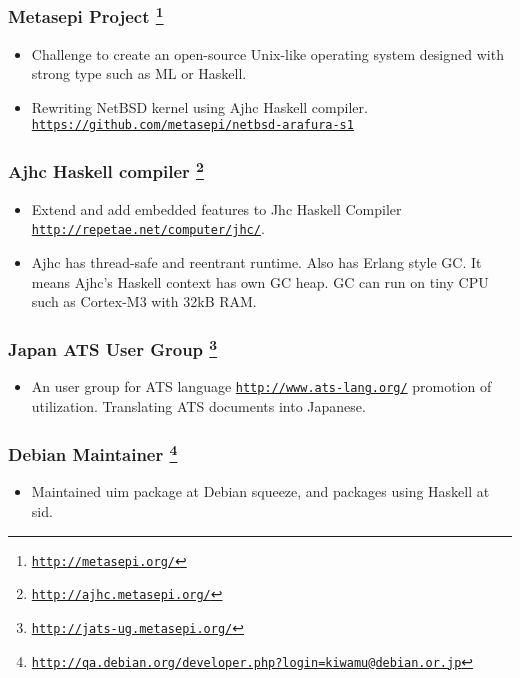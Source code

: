 \documentclass[letterpaper]{article}
\begin{document}
\subsubsection*{Metasepi Project \footnote{\href{http://metasepi.org/}{\tt http://metasepi.org/}}}
\begin{itemize}
\item Challenge to create an open-source Unix-like operating system designed with strong type such as ML or Haskell.
\item Rewriting NetBSD kernel using Ajhc Haskell compiler. \href{https://github.com/metasepi/netbsd-arafura-s1}{\tt https://github.com/metasepi/netbsd-arafura-s1}
\end{itemize}

\subsubsection*{Ajhc Haskell compiler \footnote{\href{http://ajhc.metasepi.org/}{\tt http://ajhc.metasepi.org/}}}
\begin{itemize}
\item Extend and add embedded features to Jhc Haskell Compiler \href{http://repetae.net/computer/jhc/}{\tt http://repetae.net/computer/jhc/}.
\item Ajhc has thread-safe and reentrant runtime. Also has Erlang style GC. It means Ajhc's Haskell context has own GC heap. GC can run on tiny CPU such as Cortex-M3 with 32kB RAM.
\end{itemize}

\subsubsection*{Japan ATS User Group \footnote{\href{http://jats-ug.metasepi.org/}{\tt http://jats-ug.metasepi.org/}}}
\begin{itemize}
\item An user group for ATS language \href{http://www.ats-lang.org/}{\tt http://www.ats-lang.org/} promotion of utilization. Translating ATS documents into Japanese.
\end{itemize}

\subsubsection*{Debian Maintainer \footnote{\href{http://qa.debian.org/developer.php?login=kiwamu@debian.or.jp}{\tt http://qa.debian.org/developer.php?login=kiwamu@debian.or.jp}}}
\begin{itemize}
\item Maintained uim package at Debian squeeze, and packages using Haskell at sid.
\end{itemize}
\end{document}
